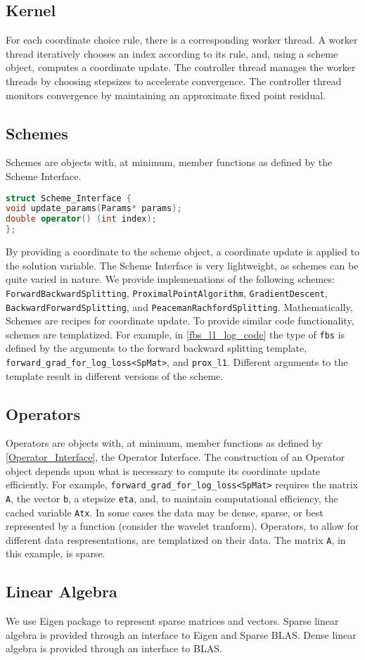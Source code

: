 \subsection{Kernel}

For each coordinate choice rule, there is a corresponding worker thread.
A worker thread iteratively chooses an index according to its rule, and, using a scheme object, computes a coordinate update.
The controller thread manages the worker threads by choosing stepsizes to accelerate convergence.
The controller thread monitors convergence by maintaining an approximate fixed point residual.

\subsection{Schemes}
Schemes are objects with, at minimum, member functions as defined by the Scheme Interface.

\begin{lstlisting}[language=C++]
struct Scheme_Interface {
void update_params(Params* params);
double operator() (int index);
};
\end{lstlisting}
By providing a coordinate to the scheme object, a coordinate update is applied to the solution variable.
 The Scheme Interface is very lightweight, as schemes can be quite varied in nature.
 We provide implemenations of the following schemes: \texttt{ForwardBackwardSplitting}, \texttt{ProximalPointAlgorithm},  \texttt{GradientDescent}, \texttt{BackwardForwardSplitting}, and \hfill \break      \texttt{PeacemanRachfordSplitting}.
Mathematically, Schemes are recipes for coordinate update.
To provide similar code functionality, schemes are templatized.  
For example, in \ref{fbs_l1_log_code} the type of \texttt{fbs} is defined by the arguments to the forward backward splitting template, \texttt{forward\_grad\_for\_log\_loss<SpMat>}, and \texttt{prox\_l1}. 
Different arguments to the template result in different versions of the scheme. 

\subsection{Operators}

Operators are objects with, at minimum, member functions as defined by \ref{Operator_Interface}, the Operator Interface.
The construction of an Operator object depends upon what is necessary to compute its coordinate update efficiently.
For example, \texttt{forward\_grad\_for\_log\_loss<SpMat>} requires the matrix \texttt{A}, the vector \texttt{b}, a stepsize \texttt{eta},  and, to maintain computational efficiency, the cached variable \texttt{Atx}.
In some cases the data may be dense, sparse, or best represented by a function (consider the wavelet tranform).
Operators, to allow for different data respresentations, are templatized on their data.
The matrix \texttt{A}, in this example, is sparse.




\subsection{Linear Algebra}

We use Eigen package to represent sparse matrices and vectors. 
Sparse linear algebra is provided through an interface to Eigen and Sparse BLAS.
Dense linear algebra is provided through an interface to BLAS. 







